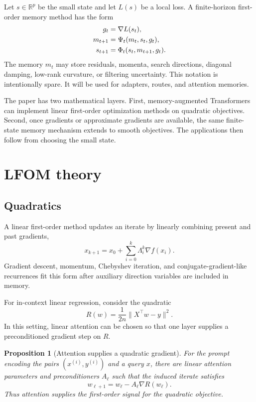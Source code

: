 \documentclass[10pt,twocolumn]{article}
\newtheorem{proposition}{Proposition}
\newcommand{\R}{\mathbb R}
\begin{document}
Let $s\in\R^p$ be the small state and let $L(s)$ be a local loss. A finite-horizon first-order memory method has the form
\begin{align}
   g_t&=\nabla L(s_t),\notag\\
   m_{t+1}&=\Psi_t(m_t,s_t,g_t),\notag\\
   s_{t+1}&=\Phi_t(s_t,m_{t+1},g_t). \label{eq:small-state}
\end{align}
The memory $m_t$ may store residuals, momenta, search directions, diagonal damping, low-rank curvature, or filtering uncertainty. This notation is intentionally spare. It will be used for adapters, routes, and attention memories.

The paper has two mathematical layers. First, memory-augmented Transformers can implement linear first-order optimization methods on quadratic objectives. Second, once gradients or approximate gradients are available, the same finite-state memory mechanism extends to smooth objectives. The applications then follow from choosing the small state.

\section{LFOM theory}
\subsection{Quadratics}
A linear first-order method updates an iterate by linearly combining present and past gradients,
\begin{equation}
   x_{k+1}=x_0+\sum_{i=0}^{k}\Lambda_i^k\nabla f(x_i). \label{eq:lfom}
\end{equation}
Gradient descent, momentum, Chebyshev iteration, and conjugate-gradient-like recurrences fit this form after auxiliary direction variables are included in memory.

For in-context linear regression, consider the quadratic
\begin{equation}
   R(w)=\frac{1}{2n}\|X^\top w-y\|^2. \label{eq:quad}
\end{equation}
In this setting, linear attention can be chosen so that one layer supplies a preconditioned gradient step on $R$.

\begin{proposition}[Attention supplies a quadratic gradient]
For the prompt encoding the pairs $(x^{(i)},y^{(i)})$ and a query $x$, there are linear attention parameters and preconditioners $A_\ell$ such that the induced iterate satisfies
\[
   w_{\ell+1}=w_\ell-A_\ell\nabla R(w_\ell).
\]
Thus attention supplies the first-order signal for the quadratic objective.
\end{proposition}
\end{document}
